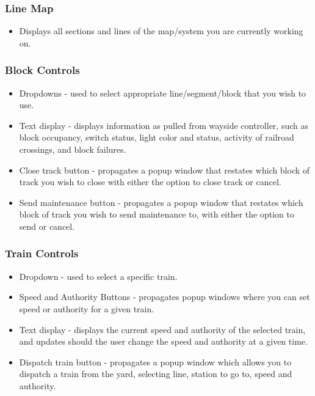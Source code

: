 \documentclass[letterpaper]{article}
\begin{document}
\subsubsection{Line Map}
\begin{itemize}
	\item Displays all sections and lines of the map/system you are currently working on.
\end{itemize}

\subsubsection{Block Controls}
\begin{itemize}
	\item Dropdowns - used to select appropriate line/segment/block that you wish to use.
	\item Text display - displays information as pulled from wayside controller, such as block occupancy, switch status, light color and status, activity of railroad crossings, and block failures.
	\item Close track button - propagates a popup window that restates which block of track you wish to close with either the option to close track or cancel.
	\item Send maintenance button - propagates a popup window that restates which block of track you wish to send maintenance to, with either the option to send or cancel.
\end{itemize}

\subsubsection{Train Controls}
\begin{itemize}
	\item Dropdown - used to select a specific train.
	\item Speed and Authority Buttons - propagates popup windows where you can set speed or authority for a given train.
	\item Text display - displays the current speed and authority of the selected train, and updates should the user change the speed and authority at a given time.
	\item Dispatch train button - propagates a popup window which allows you to dispatch a train from the yard, selecting line, station to go to, speed and authority.
\end{itemize}
\end{document}
